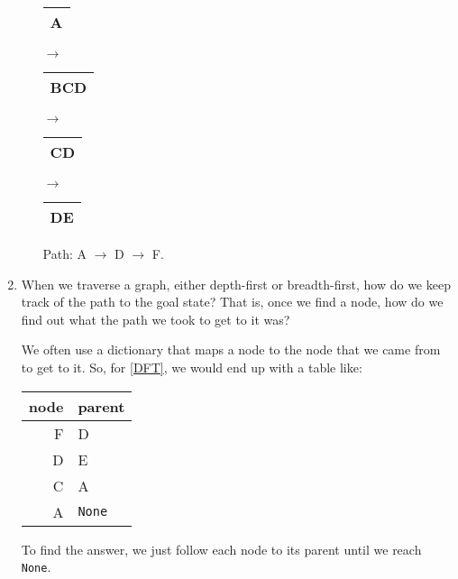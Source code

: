 \documentclass[11pt]{article}
\newenvironment{answer}{\large\lstset{basicstyle=\large}\color{white}}{}
\newenvironment{answer}{\large\lstset{basicstyle=\large}\color{red}}{}
\begin{document}
\begin{enumerate}
\begin{enumerate}
                \begin{answer}
                \begin{tabular}{c}
                \hline
                A\\\hline
                \end{tabular}
                $\rightarrow$
                \begin{tabular}{c}
                \hline
                BCD\\\hline
                \end{tabular}
                $\rightarrow$
                \begin{tabular}{c}
                \hline
                CD\\\hline
                \end{tabular}
                $\rightarrow$
                \begin{tabular}{c}
                \hline
                DE\\\hline
                \end{tabular}

                Path: A $\rightarrow$ D $\rightarrow$ F.
                \end{answer}

        \end{enumerate}

    \item When we traverse a graph, either depth-first or breadth-first, how do
        we keep track of the path to the goal state? That is, once we find a
        node, how do we find out what the path we took to get to it was?

        \begin{answer}
        We often use a dictionary that maps a node to the node that we came
        from to get to it. So, for \ref{DFT}, we would end up with a table like:
        \begin{tabular}{r|l}
        node & parent\\\hline
        F & D\\
        D & E\\
        C & A\\
        A & {\tt None}
        \end{tabular}

        To find the answer, we just follow each node to its parent until we
        reach {\tt None}.
        \end{answer}


\end{enumerate}
\end{document}
